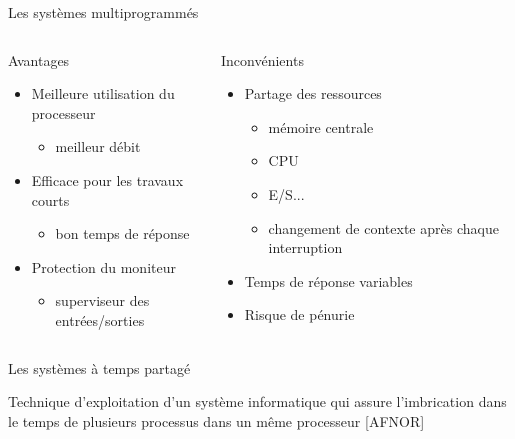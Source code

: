 \begin{frame}{Les systèmes multiprogrammés}
\begin{columns}
\begin{block}{Avantages}
\begin{itemize}
\item Meilleure utilisation du processeur
\begin{itemize}
\item meilleur débit
\end{itemize}
\item Efficace pour les travaux courts \begin{itemize}\item bon temps de réponse \end{itemize}
\item Protection du moniteur
\begin{itemize}
\item superviseur des entrées/sorties
\end{itemize}
\end{itemize}
\end{block}
\begin{block}{Inconvénients}
\begin{itemize}
\item Partage des ressources
\begin{itemize}
\item mémoire centrale
\item CPU
\item E/S...
\item changement de contexte après chaque interruption
\end{itemize}
\item Temps de réponse variables
\item Risque de pénurie
\end{itemize}
\end{block}
\end{columns}
\end{frame}


\begin{frame}{Les systèmes à temps partagé}
\begin{definition}
Technique d’exploitation d’un système informatique qui assure l’imbrication dans le temps 
de plusieurs processus dans un même processeur [AFNOR]
\end{definition}
\end{frame}

